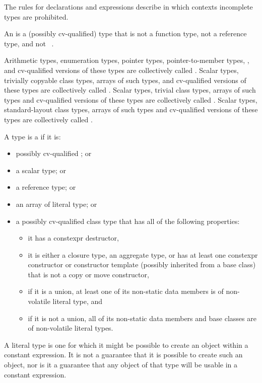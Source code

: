 \pnum
\begin{note}
The rules for declarations and expressions describe in which
contexts incomplete types are prohibited.
\end{note}

\pnum
An  is a (possibly cv-qualified) type that is not
a function type, not a reference type, and not \cv{}~.

\pnum
{}%
%
%
Arithmetic types, enumeration types,
pointer types, pointer-to-member types,
,
and
cv-qualified versions of these
types are collectively called
.
Scalar types, trivially copyable class types,
arrays of such types, and cv-qualified versions of these
types are collectively called .
Scalar types, trivial class types,
arrays of such types and cv-qualified versions of these
types are collectively called
. Scalar types, standard-layout class
types, arrays of such types and
cv-qualified versions of these types
are collectively called .

\pnum
A type is a  if it is:
\begin{itemize}
\item possibly cv-qualified ; or
\item a scalar type; or
\item a reference type; or
\item an array of literal type; or
\item a possibly cv-qualified class type that
has all of the following properties:
\begin{itemize}
\item it has a constexpr destructor,
\item it is either a closure type,
an aggregate type, or
has at least one constexpr constructor or constructor template
(possibly inherited from a base class)
that is not a copy or move constructor,
\item if it is a union, at least one of its non-static data members is
of non-volatile literal type, and
\item if it is not a union, all of its non-static data members and base classes are
of non-volatile literal types.
\end{itemize}
\end{itemize}
\begin{note}
A literal type is one for which
it might be possible to create an object
within a constant expression.
It is not a guarantee that it is possible to create such an object,
nor is it a guarantee that any object of that type
will be usable in a constant expression.
\end{note}

